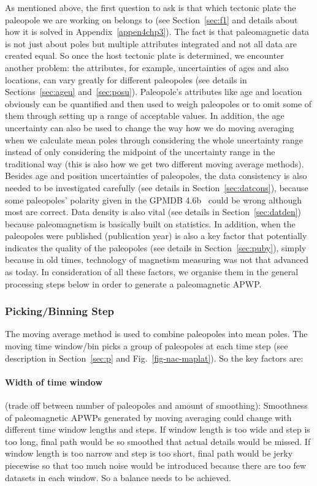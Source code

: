 As mentioned above, the first question to ask is that which tectonic plate the
paleopole we are working on belongs to (see Section~\ref{sec:f1} and details
about how it is solved in Appendix~\ref{appen4chp3}). The fact is that
paleomagnetic data is not just about poles but multiple attributes integrated
and not all data are created equal. So once the host tectonic plate is
determined, we encounter another problem: the attributes, for example,
uncertainties of ages and also locations, can vary greatly for different
paleopoles (see details in Sections~\ref{sec:ageu} and~\ref{sec:posu}).
Paleopole's attributes like age and location obviously can be quantified and
then used to weigh paleopoles or to omit some of them through setting up a range
of acceptable values. In addition, the age uncertainty can also be used to
change the way how we do moving averaging when we calculate mean poles through
considering the whole uncertainty range instead of only considering the midpoint
of the uncertainty range in the traditional way (this is also how we get two
different moving average methods). Besides age and position uncertainties of
paleopoles, the data consistency is also needed to be investigated carefully
(see details in Section~\ref{sec:datcons}), because some paleopoles' polarity
given in the GPMDB 4.6b~\cite[updated in 2016 by the Ivar Giaever Geomagnetic
Laboratory team, in collaboration with Pisarevsky]{M96,P05} could be wrong
although most are correct. Data density is also vital (see details in
Section~\ref{sec:datden}) because paleomagnetism is basically built on
statistics. In addition, when the paleopoles were published (publication year)
is also a key factor that potentially indicates the quality of the paleopoles
(see details in Section~\ref{sec:puby}), simply because in old times, technology
of magnetism measuring was not that advanced as today. In consideration of all
these factors, we organise them in the general processing steps below in order
to generate a paleomagnetic APWP\@.

\subsubsection{Picking/Binning Step}

The moving average method is used to combine paleopoles into mean poles. The
moving time window/bin picks a group of paleopoles at each time step (see
description in Section~\ref{sec:p} and Fig.~\ref{fig-nac-maplat}). So the key
factors are:

\paragraph{Width of time window}
(trade off between number of paleopoles and amount of smoothing): Smoothness of
paleomagnetic APWPs generated by moving averaging could change with different
time window lengths and steps. If window length is too wide and step is too
long, final path would be so smoothed that actual details would be missed. If
window length is too narrow and step is too short, final path would be jerky
piecewise so that too much noise would be introduced because there are too few
datasets in each window. So a balance needs to be achieved.

